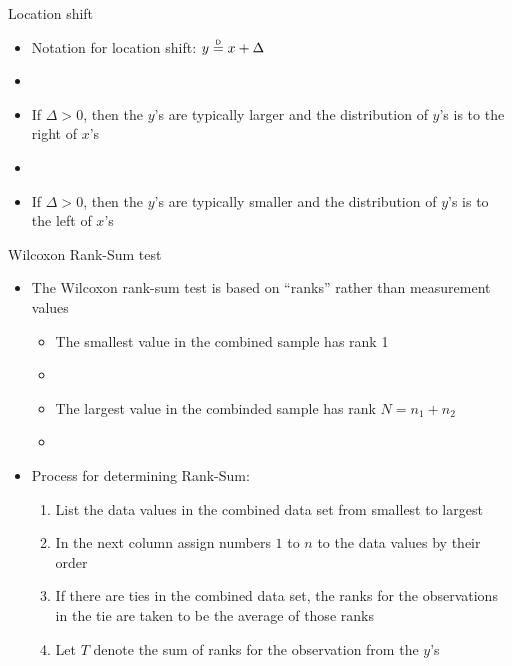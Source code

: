 \documentclass[xcolor=dvipsnames]{beamer}
\newcommand\myeq{\mathrel{\overset{\makebox[0pt]{\mbox{\normalfont\tiny\sffamily D}}}{=}}}
\begin{document}
\begin{frame}{Location shift}
	\begin{itemize}
		\item Notation for location shift: $y \myeq x + \Delta$
		\item[]
		\item If $\Delta > 0$, then the $y$'s are typically larger and the distribution of $y$'s is to the right of $x$'s
		\item[]
		\item If $\Delta > 0$, then the $y$'s are typically smaller and the distribution of $y$'s is to the left of $x$'s
	\end{itemize}
\end{frame}

\begin{frame}{Wilcoxon Rank-Sum test}
	\begin{itemize}
		\item The Wilcoxon rank-sum test is based on ``ranks'' rather than measurement values
		\begin{itemize}
			\item The smallest value in the combined sample has rank 1
			\item[]
			\item The largest value in the combinded sample has rank $N = n_1 + n_2$
			\item[]
		\end{itemize}
	\item Process for determining Rank-Sum:
		\begin{enumerate}
		\item List the data values in the combined data set from smallest to largest
		\item In the next column assign numbers $1$ to $n$ to the data values by their order
		\item If there are ties in the combined data set, the ranks for the observations in the tie are taken to be the average of those ranks
		\item Let $T$ denote the sum of ranks for the observation from the $y$'s
	\end{enumerate}
	\end{itemize}
\end{frame}
\end{document}
